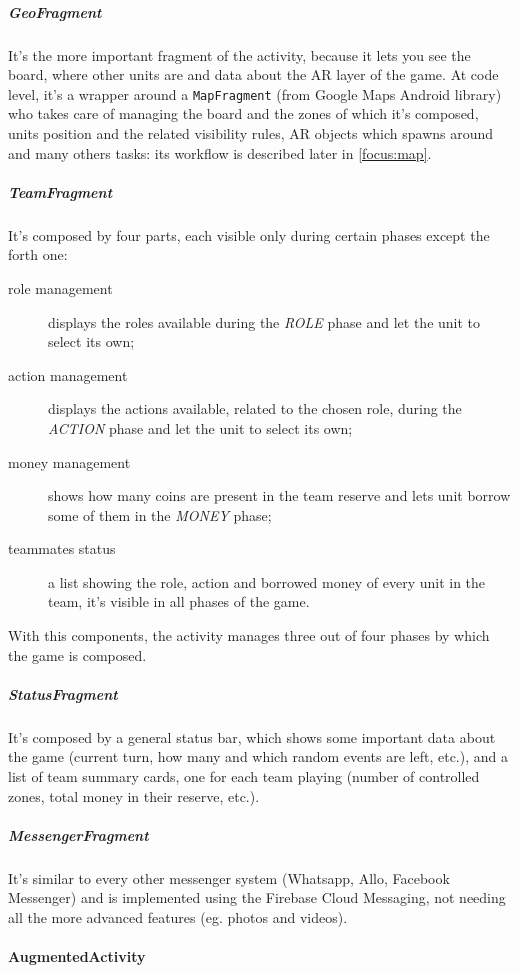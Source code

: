 			\subparagraph{GeoFragment}
			
			It's the more important fragment of the activity, because it lets you see the board, where other units are and data about the AR layer of the game.
			At code level, it's a wrapper around a \lstinline|MapFragment| (from Google Maps Android library) who takes care of managing the board and the zones of which it's composed, units position and the related visibility rules, AR objects which spawns around and many others tasks: its workflow is described later in \autoref{focus:map}.
			
			\subparagraph{TeamFragment}
			
			It's composed by four parts, each visible only during certain phases except the forth one:
			\begin{description}
				\item[role management] displays the roles available during the \emph{ROLE} phase and let the unit to select its own;
				\item[action management] displays the actions available, related to the chosen role, during the \emph{ACTION} phase and let the unit to select its own;
				\item[money management] shows how many coins are present in the team reserve and lets unit borrow some of them in the \emph{MONEY} phase;
				\item[teammates status] a list showing the role, action and borrowed money of every unit in the team, it's visible in all phases of the game.
			\end{description}
			
			With this components, the activity manages three out of four phases by which the game is composed.
			
			\subparagraph{StatusFragment}
			
			It's composed by a general status bar, which shows some important data about the game (current turn, how many and which random events are left, etc.), and a list of team summary cards, one for each team playing (number of controlled zones, total money in their reserve, etc.).
			
			\subparagraph{MessengerFragment}
			
			It's similar to every other messenger system (Whatsapp, Allo, Facebook Messenger) and is implemented using the Firebase Cloud Messaging, not needing all the more advanced features (eg. photos and videos).
		
		\paragraph{AugmentedActivity}
		
